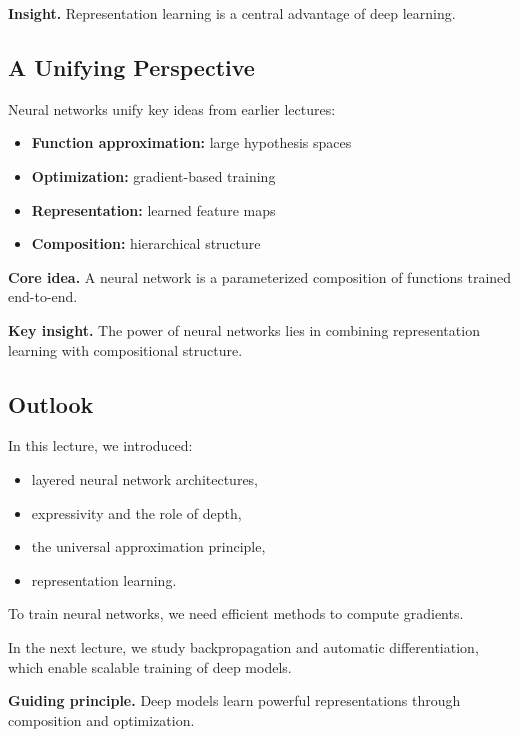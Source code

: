 \medskip

\noindent
\textbf{Insight.}  
Representation learning is a central advantage of deep learning.

\subsection{A Unifying Perspective}

Neural networks unify key ideas from earlier lectures:

\begin{itemize}
    \item \textbf{Function approximation:} large hypothesis spaces
    \item \textbf{Optimization:} gradient-based training
    \item \textbf{Representation:} learned feature maps
    \item \textbf{Composition:} hierarchical structure
\end{itemize}

\medskip

\noindent
\textbf{Core idea.}  
A neural network is a parameterized composition of functions trained end-to-end.

\medskip

\noindent
\textbf{Key insight.}  
The power of neural networks lies in combining representation learning with compositional structure.

\subsection{Outlook}

In this lecture, we introduced:

\begin{itemize}
    \item layered neural network architectures,
    \item expressivity and the role of depth,
    \item the universal approximation principle,
    \item representation learning.
\end{itemize}

\medskip

\noindent
To train neural networks, we need efficient methods to compute gradients.

\medskip

\noindent
In the next lecture, we study backpropagation and automatic differentiation, which enable scalable training of deep models.

\medskip

\noindent
\textbf{Guiding principle.}  
Deep models learn powerful representations through composition and optimization.